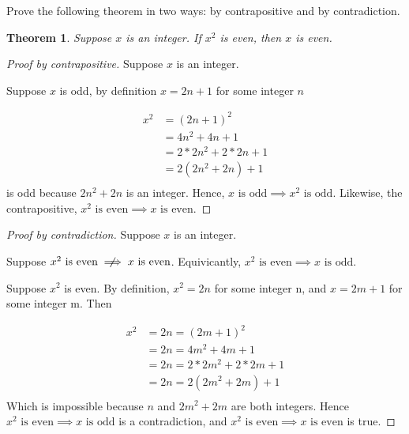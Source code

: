 \documentclass{article} %
\theoremstyle{plain}
\newtheorem*{theorem*}{Theorem}
\begin{document}
\noindent {} Prove the following theorem in two ways: by contrapositive and by contradiction. 


\begin{theorem*} Suppose $x$ is an integer. If $x^2$ is even, then $x$ is even. 

\end{theorem*}



\begin{proof}[Proof by contrapositive]
    Suppose $x$ is an integer.

    Suppose $x$ is odd, by definition $x = 2n + 1$ for some integer $n$

    \begin{align*}
        x^2 & = (2n+1)^2 \\
        & = 4n^2 + 4n + 1 \\
        & = 2*2n^2 + 2*2n + 1 \\
        & = 2(2n^2 + 2n) + 1 \\
    \end{align*}
    is odd because $2n^2 + 2n$ is an integer.  
    Hence, $x \text{ is odd} \implies x^2 \text{ is odd}$.
    Likewise, the contrapositive, $x^2 \text{ is even} \implies x \text{ is even}$.

\end{proof} 

\begin{proof}[Proof by contradiction]
    Suppose $x$ is an integer.

    Suppose $x^2 \text{ is even} \centernot\implies x \text{ is even}$. 
    Equivicantly, $x^2 \text{ is even} \implies x \text{ is odd}$. 

    Suppose $x^2$ is even. By definition, $x^2 = 2n$ for some integer n, and $x = 2m+1$ for some integer m. Then
    
    \begin{align*}
        x^2 & = 2n = (2m+1)^2 \\
        & = 2n = 4m^2 + 4m + 1 \\
        & = 2n = 2*2m^2 + 2*2m + 1 \\
        & = 2n = 2(2m^2 + 2m) + 1 \\
    \end{align*}
    Which is impossible because $n$ and $2m^2 + 2m$ are both integers.
    Hence $x^2 \text{ is even} \implies x \text{ is odd}$ is a contradiction, and $x^2 \text{ is even} \implies x \text{ is even}$ is true.

\end{proof} 
    
\end{document}
